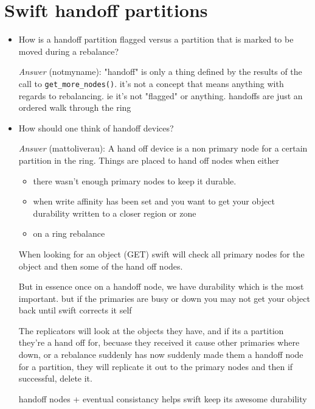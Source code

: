 \documentclass{article}
\begin{document}
\section{Swift handoff partitions}
\label{sec:org345821a}
\begin{itemize}
\item How is a handoff partition flagged versus a partition that is
marked to be moved during a rebalance?

    \emph{Answer} (notmyname): "handoff" is only a thing defined by the
results of the call to \texttt{get\_more\_nodes()}. it's not a concept
that means anything with regards to rebalancing. ie it's not
"flagged" or anything. handoffs are just an ordered walk through
the ring
\end{itemize}


\begin{itemize}
\item How should one think of handoff devices?

\emph{Answer} (mattoliverau): A hand off device is a non primary node
for a certain partition in the ring. Things are placed to hand
off nodes when either

\begin{itemize}
\item there wasn't enough primary nodes to keep it durable.
\end{itemize}
\begin{itemize}
\item when write affinity has been set and you want to get your
object durability written to a closer region or zone
\item on a ring rebalance
\end{itemize}

When looking for an object (GET) swift will check all primary
nodes for the object and then some of the hand off nodes.

But in essence once on a handoff node, we have durability which
is the most important. but if the primaries are busy or down you
may not get your object back until swift corrects it self

The replicators will look at the objects they have, and if its a
partition they're a hand off for, becuase they received it cause
other primaries where down, or a rebalance suddenly has now
suddenly made them a handoff node for a partition, they will
replicate it out to the primary nodes and then if successful,
delete it.

handoff nodes + eventual consistancy helps swift keep its awesome
durability
\end{itemize}
\end{document}
